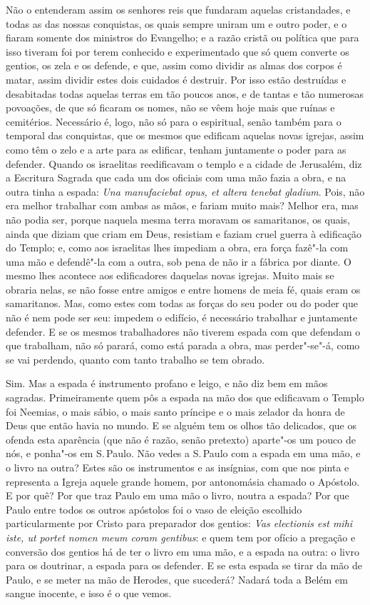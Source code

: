 Não o entenderam assim os senhores reis que fundaram aquelas
cristandades, e todas as das nossas conquistas, os quais sempre uniram
um e outro poder, e o fiaram somente dos ministros do Evangelho; e a
razão cristã ou política que para isso tiveram foi por terem conhecido e
experimentado que só quem converte os gentios, os zela e os defende, e
que, assim como dividir as almas dos corpos é matar, assim dividir estes
dois cuidados é destruir. Por isso estão destruídas e desabitadas todas
aquelas terras em tão poucos anos, e de tantas e tão numerosas
povoações, de que só ficaram os nomes, não se vêem hoje mais que ruínas
e cemitérios. Necessário é, logo, não só para o espiritual, senão também
para o temporal das conquistas, que os mesmos que edificam aquelas novas
igrejas, assim como têm o zelo e a arte para as edificar, tenham
juntamente o poder para as defender. Quando os israelitas reedificavam o
templo e a cidade de Jerusalém, diz a Escritura Sagrada que cada um dos
oficiais com uma mão fazia a obra, e na outra tinha a espada: \emph{Una
manufaciebat opus, et altera tenebat gladium}. %
Pois, não era melhor trabalhar com ambas as mãos, e fariam muito
mais? Melhor era, mas não podia ser, porque naquela mesma terra moravam
os samaritanos, os quais, ainda que diziam que criam em Deus, resistiam
e faziam cruel guerra à edificação do Templo; e, como aos israelitas
lhes impediam a obra, era força fazê"-la com uma mão e defendê"-la com a
outra, sob pena de não ir a fábrica por diante. O mesmo lhes acontece
aos edificadores daquelas novas igrejas. Muito mais se obraria nelas, se
não fosse entre amigos e entre homens de meia fé, quais eram os
samaritanos. Mas, como estes com todas as forças do seu poder ou do
poder que não é nem pode ser seu: impedem o edifício, é necessário
trabalhar e juntamente defender. E se os mesmos trabalhadores não
tiverem espada com que defendam o que trabalham, não só parará, como
está parada a obra, mas perder"-se"-á, como se vai perdendo, quanto com
tanto trabalho se tem obrado.

Sim. Mas a espada é instrumento profano e leigo, e não diz bem em mãos
sagradas. Primeiramente quem pôs a espada na mão dos que edificavam o
Templo foi Neemias, o mais sábio, o mais santo príncipe e o mais zelador
da honra de Deus que então havia no mundo. E se alguém tem os olhos tão
delicados, que os ofenda esta aparência (que não é razão, senão
pretexto) aparte"-os um pouco de nós, e ponha"-os em S.\,Paulo. Não vedes
a S.\,Paulo com a espada em uma mão, e o livro na outra? Estes são os
instrumentos e as insígnias, com que nos pinta e representa a Igreja
aquele grande homem, por antonomásia chamado o Apóstolo. E por quê? Por
que traz Paulo em uma mão o livro, noutra a espada? Por que Paulo entre
todos os outros apóstolos foi o vaso de eleição escolhido
particularmente por Cristo para preparador dos gentios: \emph{Vas
electionis est mihi iste, ut portet nomen meum coram gentibus}: e quem tem por ofício a pregação e conversão dos gentios há de
ter o livro em uma mão, e a espada na outra: o livro para os doutrinar,
a espada para os defender. E se esta espada se tirar da mão de Paulo, e
se meter na mão de Herodes, que sucederá? Nadará toda a Belém em sangue
inocente, e isso é o que vemos.

